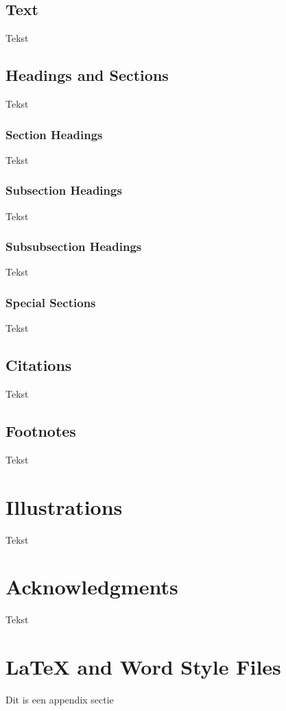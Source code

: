 \documentclass{article}
\begin{document}
\subsection{Text}

Tekst

\subsection{Headings and Sections}

Tekst

\subsubsection{Section Headings}

Tekst

\subsubsection{Subsection Headings}

Tekst

\subsubsection{Subsubsection Headings}

Tekst

\subsubsection{Special Sections}

Tekst

\subsection{Citations}

Tekst

\subsection{Footnotes}

Tekst

\section{Illustrations}

Tekst

\section*{Acknowledgments}

Tekst

\appendix

\section{\LaTeX{} and Word Style Files}\label{stylefiles}
Dit is een appendix sectie



\end{document}
